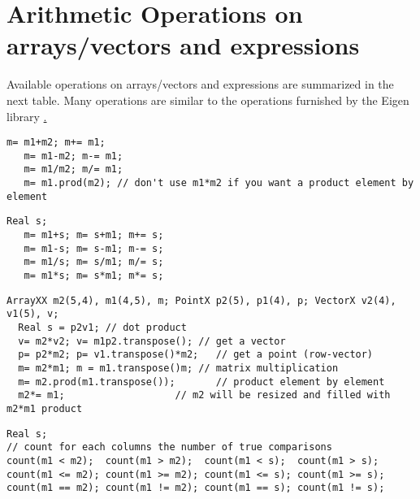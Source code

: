 \documentclass[a4paper,10pt]{article}
\begin{document}
\section{Arithmetic Operations on arrays/vectors and expressions}

Available operations on arrays/vectors and expressions are summarized in the next table.
Many operations are similar to the operations
furnished by the Eigen library \href{http://eigen.tuxfamily.org/}.

\begin{lstlisting}[style=customcpp,caption=add\, subtract\, divide\, multiply arrays element by element"]
   m= m1+m2; m+= m1;
   m= m1-m2; m-= m1;
   m= m1/m2; m/= m1;
   m= m1.prod(m2); // don't use m1*m2 if you want a product element by element
\end{lstlisting}

\begin{lstlisting}[style=customcpp,caption=add\, subtract\, divide\, multiply a number]
   Real s;
   m= m1+s; m= s+m1; m+= s;
   m= m1-s; m= s-m1; m-= s;
   m= m1/s; m= s/m1; m/= s;
   m= m1*s; m= s*m1; m*= s;
\end{lstlisting}

\begin{lstlisting}[style=customcpp,caption=matrix by matrix/vector products]
  ArrayXX m2(5,4), m1(4,5), m; PointX p2(5), p1(4), p; VectorX v2(4), v1(5), v;
  Real s = p2v1; // dot product
  v= m2*v2; v= m1p2.transpose(); // get a vector
  p= p2*m2; p= v1.transpose()*m2;   // get a point (row-vector)
  m= m2*m1; m = m1.transpose()m; // matrix multiplication
  m= m2.prod(m1.transpose());       // product element by element
  m2*= m1;                   // m2 will be resized and filled with m2*m1 product
\end{lstlisting}

\begin{lstlisting}[style=customcpp,caption=Comparisons operators]
Real s;
// count for each columns the number of true comparisons
count(m1 < m2);  count(m1 > m2);  count(m1 < s);  count(m1 > s);
count(m1 <= m2); count(m1 >= m2); count(m1 <= s); count(m1 >= s);
count(m1 == m2); count(m1 != m2); count(m1 == s); count(m1 != s);
\end{lstlisting}
\end{document}

